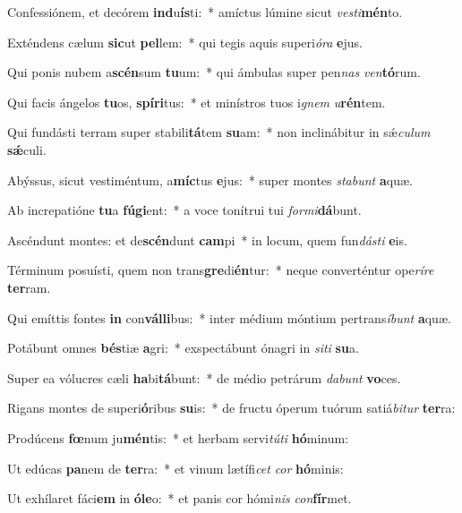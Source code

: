 \item Confessiónem, et decórem \textbf{ind}u\textbf{ís}ti:~* amíctus lúmine sicut \textit{ves}\textit{ti}\textbf{mén}to.
\item Exténdens cælum \textbf{sic}ut \textbf{pel}lem:~* qui tegis aquis superi\textit{ó}\textit{ra} \textbf{e}jus.
\item Qui ponis nubem a\textbf{scén}sum \textbf{tu}um:~* qui ámbulas super pen\textit{nas} \textit{ven}\textbf{tó}rum.
\item Qui facis ángelos \textbf{tu}os, \textbf{spí}\textbf{ri}tus:~* et minístros tuos i\textit{gnem} \textit{u}\textbf{rén}tem.
\item Qui fundásti terram super stabili\textbf{tá}tem \textbf{su}am:~* non inclinábitur in sǽ\textit{cu}\textit{lum} \textbf{sǽ}culi.
\item Abýssus, sicut vestiméntum, a\textbf{míc}tus \textbf{e}jus:~* super montes \textit{sta}\textit{bunt} \textbf{a}quæ.
\item Ab increpatióne \textbf{tu}a \textbf{fú}\textbf{gi}ent:~* a voce tonítrui tui \textit{for}\textit{mi}\textbf{dá}bunt.
\item Ascéndunt montes: et de\textbf{scén}dunt \textbf{cam}pi~* in locum, quem fun\textit{dás}\textit{ti} \textbf{e}is.
\item Términum posuísti, quem non trans\textbf{gre}di\textbf{én}tur:~* neque converténtur ope\textit{rí}\textit{re} \textbf{ter}ram.
\item Qui emíttis fontes \textbf{in} con\textbf{vál}\textbf{li}bus:~* inter médium móntium pertrans\textit{í}\textit{bunt} \textbf{a}quæ.
\item Potábunt omnes \textbf{bés}tiæ \textbf{a}gri:~* exspectábunt ónagri in \textit{si}\textit{ti} \textbf{su}a.
\item Super ea vólucres cæli \textbf{ha}bi\textbf{tá}bunt:~* de médio petrárum \textit{da}\textit{bunt} \textbf{vo}ces.
\item Rigans montes de superi\textbf{ó}ribus \textbf{su}is:~* de fructu óperum tuórum satiá\textit{bi}\textit{tur} \textbf{ter}ra:
\item Prodúcens \textbf{fœ}num ju\textbf{mén}tis:~* et herbam servi\textit{tú}\textit{ti} \textbf{hó}minum:
\item Ut edúcas \textbf{pa}nem de \textbf{ter}ra:~* et vinum lætífi\textit{cet} \textit{cor} \textbf{hó}minis:
\item Ut exhílaret fáci\textbf{em} in \textbf{ó}\textbf{le}o:~* et panis cor hómi\textit{nis} \textit{con}\textbf{fír}met.
